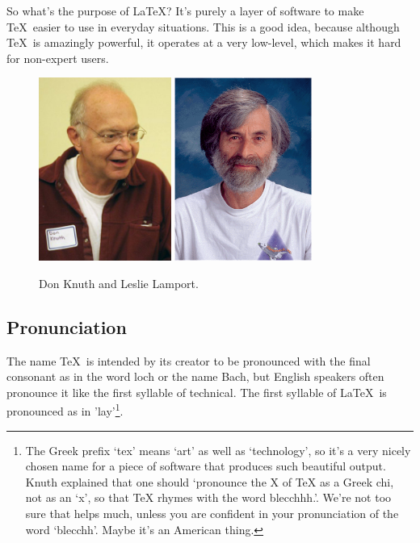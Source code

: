 \begin{refsection}
  
So what's the purpose of \LaTeX ? It's purely a layer of software to make \TeX\ easier to use in everyday situations. This is a good idea, because although \TeX\ is amazingly powerful, it operates at a very low-level, which makes it hard for non-expert users.

\begin{figure}[hb]
  \centering
     \includegraphics[height=6cm]{images/knuth.png}
\quad\quad  \includegraphics[height=6cm]{images/lamport.png}
\caption{Don Knuth and Leslie Lamport.}\label{figure:knuthlamport}
\end{figure}

\subsection{Pronunciation}
\label{sec:pronunciation}
  The name \TeX\ is intended by its creator to be pronounced with the final consonant as in the word loch or the name Bach, but English speakers often pronounce it like the first syllable of technical. The first syllable of \LaTeX\ is pronounced as in 'lay'\footnote{The Greek prefix `tex' means `art' as well as `technology', so it's a very nicely chosen name for a piece of software that produces such beautiful output. Knuth explained \citep{knuth1984} that one should `pronounce the X of TeX as a Greek chi, not as an `x', so that TeX rhymes with the word blecchhh.'. We're not too sure that helps much, unless you are confident in your pronunciation of the word `blecchh'. Maybe it's an American thing.}.



\end{refsection}
